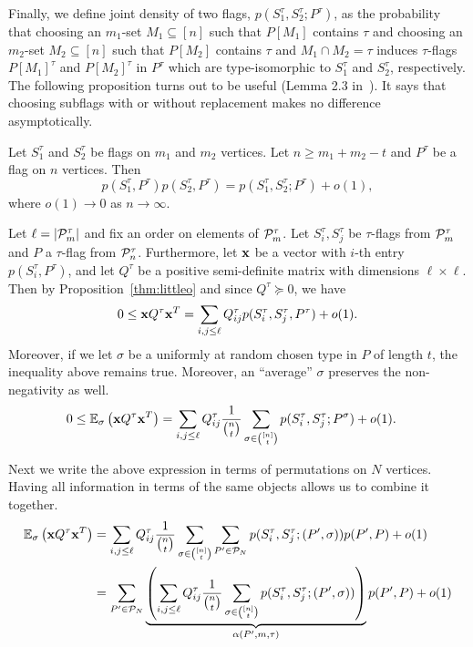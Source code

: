 \documentclass[12pt, a4paper, twoside]{report}
\begin{document}
Finally, we define joint density of two flags, $p(S_1^{\tau}, S_2^{\tau}; P^{\tau})$, as the probability that choosing an $m_1$-set $M_1 \subseteq [n]$ such that $P[M_1]$ contains $\tau$ and choosing an $m_2$-set $M_2 \subseteq [n]$ such that $P[M_2]$ contains $\tau$ and $M_1 \cap M_2 = \tau$ induces $\tau$-flags $P[M_1]^{\tau}$ and $P[M_2]^{\tau}$ in $P^\tau$ which are type-isomorphic to $S_1^{\tau}$ and $S_2^{\tau}$, respectively. The following proposition turns out to be useful (Lemma 2.3 in~\cite{razborov2007original}). It says that choosing subflags with or without replacement makes no difference asymptotically.

\begin{proposition}
Let $S_1^{\tau}$ and $S_2^{\tau}$ be flags on $m_1$ and $m_2$ vertices. Let $n \geq m_1 + m_2 - t$ and $P^{\tau}$ be a flag on $n$ vertices. Then
$$p(S_1^{\tau},P^{\tau})p(S_2^{\tau},P^{\tau}) = p(S_1^{\tau},S_2^{\tau}; P^{\tau}) + o(1),$$
where $o(1) \to 0$ as $n \to \infty$.
\label{thm:littleo}
\end{proposition}

Let $\ell = |\P_m^\tau|$ and fix an order on elements of $\P_m^\tau$. Let $S^\tau_i,S^\tau_j$ be $\tau$-flags from $\P_m^\tau$ and $P$ a $\tau$-flag from $\P_n^\tau$. Furthermore, let $\x$ be a vector with $i$-th entry $p(S_i^{\tau}, P^{\tau})$, and let $Q^\tau$ be a positive semi-definite matrix with dimensions $\ell \times \ell$. Then by Proposition~\ref{thm:littleo} and since $Q^\tau \succeq 0$, we have
$$ 0 \leq \x Q^\tau \x^T = \sum_{i,j \leq \ell} Q^\tau_{ij}p(S_i^{\tau},S_j^{\tau},P^{\tau}) + o(1).$$
Moreover, if we let $\sigma$ be a uniformly at random chosen type in $P$ of length $t$, the inequality above remains true. Moreover, an ``average'' $\sigma$ preserves the non-negativity as well. 
\begin{align}
0 \leq \mathbb{E}_{\sigma}\left(\x Q^\tau \x^T\right) &= \sum_{i,j \leq \ell}Q^\tau_{ij}\frac{1}{\binom{n}{t}}\sum_{\sigma \in \binom{[n]}{t}} p(S_i^{\tau}, S_j^{\tau}; P^{\sigma}) + o(1). \label{eq:fcoeffs}
\end{align}

Next we write the above expression in terms of permutations on $N$ vertices. Having all information in terms of the same objects allows us to combine it together.  
\begin{align*}
\mathbb{E}_{\sigma}\left(\x Q^\tau \x^T\right) &= \sum_{i,j \leq \ell} Q^\tau_{ij} \frac{1}{\binom{n}{t}}\sum_{\sigma \in \binom{[n]}{t}} \sum_{P' \in \P_N}p(S_i^{\tau}, S_j^{\tau}; (P',\sigma)) p(P',P) + o(1)\\
&=  \sum_{P' \in \P_N}\underbrace{\left(\sum_{i,j \leq \ell} Q^\tau_{ij}\frac{1}{\binom{n}{t}}\sum_{\sigma \in \binom{[n]}{t}}p(S_i^{\tau}, S_j^{\tau}; (P',{\sigma})) \right)}_{\alpha(P', m,\tau)} p(P',P) + o(1)
\end{align*}
\end{document}
